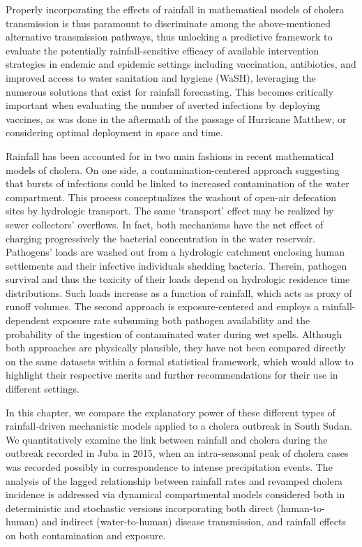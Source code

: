 Properly incorporating the effects of rainfall in mathematical models of cholera transmission is thus paramount to discriminate among the above-mentioned alternative transmission pathways, thus unlocking a predictive framework to evaluate the potentially rainfall-sensitive efficacy of available intervention strategies in endemic and epidemic settings including vaccination, antibiotics, and improved access to water sanitation and hygiene (WaSH), leveraging the numerous solutions that exist for rainfall forecasting\cite{Rinaldo:Reassessment20102011:2012,Bertuzzo:ProbabilityExtinctionHaiti:2016}. This becomes  critically important when evaluating the number of averted infections by deploying vaccines, as was done in the aftermath of the passage of Hurricane Matthew\cite{Pasetto:RealtimeProjectionsCholera:2017}, or considering optimal deployment in space and time.

Rainfall has been accounted for in two main fashions in recent mathematical models of cholera. On one side, a contamination-centered approach suggesting that bursts of infections could be linked to increased contamination of the water compartment\cite{Rinaldo:Reassessment20102011:2012}. This process conceptualizes the washout of open-air defecation sites by hydrologic transport. The same `transport' effect may be realized by sewer collectors' overflows. In fact, both mechanisms have the net effect of charging progressively the bacterial concentration in the water reservoir\cite{Codeco:EndemicEpidemicDynamics:2001}. Pathogens' loads are washed out from a hydrologic catchment enclosing human settlements and their infective individuals shedding bacteria. Therein, pathogen survival and thus the toxicity of their loads depend on hydrologic residence time distributions\cite{Rinaldo:Reassessment20102011:2012,Rinaldo:ModelingKeyDrivers:2017}. Such loads increase as a function of rainfall, which acts as proxy of runoff volumes. The second approach is exposure-centered and employs a rainfall-dependent exposure rate subsuming both pathogen availability and the probability of the ingestion of contaminated water during wet spells\cite{Eisenberg:ExaminingRainfallCholera:2013}. Although both approaches are physically plausible, they have not been compared directly on the same datasets within a formal statistical framework, which would allow to highlight their respective merits and further recommendations for their use in different settings.

In this chapter, we compare the explanatory power of these different types of rainfall-driven mechanistic models applied to a cholera outbreak in South Sudan. We quantitatively examine the link between rainfall and cholera during the outbreak recorded in Juba in 2015, when an intra-seasonal peak of cholera cases was recorded possibly in correspondence to intense precipitation events. The analysis of the lagged relationship between rainfall rates and revamped cholera incidence is addressed via dynamical compartmental models considered both in deterministic and stochastic versions incorporating both direct (human-to-human) and indirect (water-to-human) disease transmission, and rainfall effects on both contamination and exposure.

